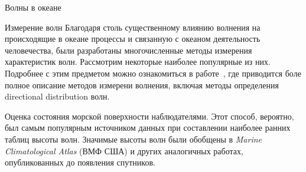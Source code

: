 \begin{chapter}{Волны в океане}
\begin{section}{Измерение волн}
Благодаря столь существенному влиянию
волнения на происходящие в океане процессы и связанную с океаном деятельность
человечества, были разработаны многочисленные методы измерения характеристик
волн. Рассмотрим некоторые наиболее популярные из них. Подробнее с этим
предметом можно ознакомиться в работе~\cite{Stewart:1980}, где приводится
боле полное описание методов измерени волнения, включая методы определения
directional distribution волн.
%

\begin{paragraph}{Оценка состояния морской поверхности наблюдателями.} 
Этот способ, вероятно, был самым популярным источником данных
при составлении наиболее ранних таблиц высоты волн. Значимые высоты
волн были обобщены в \emph{Marine Climatological Atlas} (ВМФ США)
и других аналогичных работах, опубликованных до появления спутников.
%
\end{paragraph}


\end{section}
\end{chapter}
